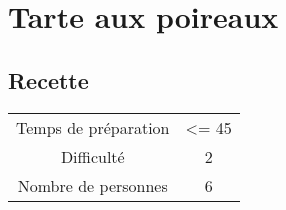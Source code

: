 \newpage
\section{Tarte aux poireaux}
    \label{sec:Tarte aux poireaux}
    \subsection{Recette}
    \vspace{1cm}


    \begin{center}
        \begin{tabular}{c|c}
            Temps de préparation & <= 45 \\
            Difficulté & 2 \\
            Nombre de personnes & 6 
        \end{tabular}
    \end{center}{}

    \vspace{1cm}
    \hline
    \vspace{1cm}

